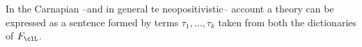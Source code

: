 In the Carnapian --and in general te neopositivistic-- account a theory can be expressed as a sentence formed by terms $\tau_1, \dots, \tau_k$ taken from both the dictionaries of $F_\clL$.


